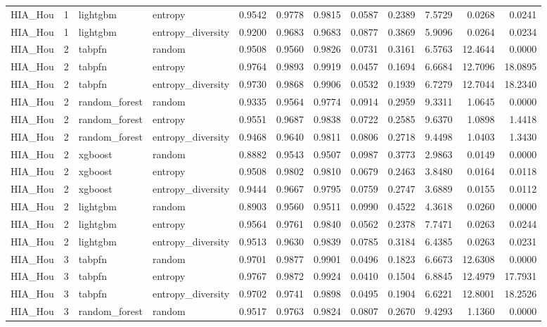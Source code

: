 \begin{tabular}{lrllrrrrrrrr}
HIA_Hou & 1 & lightgbm & entropy & 0.9542 & 0.9778 & 0.9815 & 0.0587 & 0.2389 & 7.5729 & 0.0268 & 0.0241 \\
HIA_Hou & 1 & lightgbm & entropy_diversity & 0.9200 & 0.9683 & 0.9683 & 0.0877 & 0.3869 & 5.9096 & 0.0264 & 0.0234 \\
HIA_Hou & 2 & tabpfn & random & 0.9508 & 0.9560 & 0.9826 & 0.0731 & 0.3161 & 6.5763 & 12.4644 & 0.0000 \\
HIA_Hou & 2 & tabpfn & entropy & 0.9764 & 0.9893 & 0.9919 & 0.0457 & 0.1694 & 6.6684 & 12.7096 & 18.0895 \\
HIA_Hou & 2 & tabpfn & entropy_diversity & 0.9730 & 0.9868 & 0.9906 & 0.0532 & 0.1939 & 6.7279 & 12.7044 & 18.2340 \\
HIA_Hou & 2 & random_forest & random & 0.9335 & 0.9564 & 0.9774 & 0.0914 & 0.2959 & 9.3311 & 1.0645 & 0.0000 \\
HIA_Hou & 2 & random_forest & entropy & 0.9551 & 0.9687 & 0.9838 & 0.0722 & 0.2585 & 9.6370 & 1.0898 & 1.4418 \\
HIA_Hou & 2 & random_forest & entropy_diversity & 0.9468 & 0.9640 & 0.9811 & 0.0806 & 0.2718 & 9.4498 & 1.0403 & 1.3430 \\
HIA_Hou & 2 & xgboost & random & 0.8882 & 0.9543 & 0.9507 & 0.0987 & 0.3773 & 2.9863 & 0.0149 & 0.0000 \\
HIA_Hou & 2 & xgboost & entropy & 0.9508 & 0.9802 & 0.9810 & 0.0679 & 0.2463 & 3.8480 & 0.0164 & 0.0118 \\
HIA_Hou & 2 & xgboost & entropy_diversity & 0.9444 & 0.9667 & 0.9795 & 0.0759 & 0.2747 & 3.6889 & 0.0155 & 0.0112 \\
HIA_Hou & 2 & lightgbm & random & 0.8903 & 0.9560 & 0.9511 & 0.0990 & 0.4522 & 4.3618 & 0.0260 & 0.0000 \\
HIA_Hou & 2 & lightgbm & entropy & 0.9564 & 0.9761 & 0.9840 & 0.0562 & 0.2378 & 7.7471 & 0.0263 & 0.0244 \\
HIA_Hou & 2 & lightgbm & entropy_diversity & 0.9513 & 0.9630 & 0.9839 & 0.0785 & 0.3184 & 6.4385 & 0.0263 & 0.0231 \\
HIA_Hou & 3 & tabpfn & random & 0.9701 & 0.9877 & 0.9901 & 0.0496 & 0.1823 & 6.6673 & 12.6308 & 0.0000 \\
HIA_Hou & 3 & tabpfn & entropy & 0.9767 & 0.9872 & 0.9924 & 0.0410 & 0.1504 & 6.8845 & 12.4979 & 17.7931 \\
HIA_Hou & 3 & tabpfn & entropy_diversity & 0.9702 & 0.9741 & 0.9898 & 0.0495 & 0.1904 & 6.6221 & 12.8001 & 18.2526 \\
HIA_Hou & 3 & random_forest & random & 0.9517 & 0.9763 & 0.9824 & 0.0807 & 0.2670 & 9.4293 & 1.1360 & 0.0000 \\

\end{tabular}
